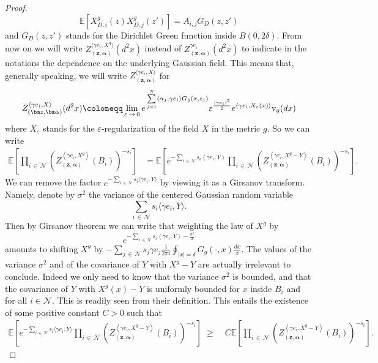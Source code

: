 \documentclass[10pt]{amsart}
\theoremstyle{definition}\newtheorem{defi}[theo]{Definition}\newtheorem{rema}[theo]{Remark}\newtheorem{exam}[theo]{Example}\newtheorem{exem}[theo]{Example}\newtheorem{nota}[theo]{Notation}
\renewcommand{\geq}{\;\geqslant\;}
\newcommand{\rmv}{\mathrm{v}}
\newcommand{\clN}{\mathcal{N}}
\newcommand{\E}{\mathbb{E}}
\newcommand*\eps{\varepsilon}
\let\oldhat\hat
\renewcommand*{\hat}[1]{\mathchoice{\widehat{#1}}{\widehat{#1}}{\oldhat{#1}}{\oldhat{#1}}}
\begin{document}
\begin{proof}
\begin{equation*}
\E\left[X^g_{D,i}(z) X^g_{D,j}(z')\right]=A_{i,j} G_D(z,z')
\end{equation*}
and $G_D(z,z')$ stands for the Dirichlet Green function inside $B(0,2\delta)$. From now on we will write $Z_{(\bm z,\bm \alpha)}^{\langle\gamma e_i,X^g\rangle} (d^2x)$ instead of $Z_{(\bm z,\bm \alpha)}^{\gamma e_i} (d^2x)$ to indicate in the notations the dependence on the underlying Gaussian field. This means that, generally speaking, we will write $Z_{(\bm z,\bm \alpha)}^{\langle\gamma e_i,X\rangle} $ for
\[
Z_{(\bm z,\bm \alpha)}^{\left\langle\gamma e_i,X\right\rangle} (d^2x)\coloneqq \lim_{\eps\,\to\,0}e^{\,\sum\limits_{j=1}^N \langle\alpha_j,\gamma e_i \rangle G_{\hat{g}} (x,z_j) } \eps^{ \frac{|\gamma e_i|^2}{2}} e^{ \langle\gamma e_i, X_\eps(x) \rangle} \rmv_g(dx)
\]
where $X_\eps$ stands for the $\eps$-regularization of the field $X$ in the metric $g$. So we can write
\begin{align*}
\E \left[\prod_{i\,\in\,\clN} \left(Z_{\left(\bm z,\bm \alpha\right)}^{\left\langle\gamma e_i,X^g\right\rangle} \left(B_i\right)\right)^{- s_i} \right] &= \E \left [e^{-\sum_{i\,\in\,\clN}s_i\left\langle\gamma e_i,Y\right\rangle} \prod_{i\,\in\,\clN} \left(Z_{\left(\bm z,\bm \alpha\right)}^{\left\langle\gamma e_i,X^g-Y\right\rangle}\left(B_i\right)\right)^{- s_i} \right].
\end{align*}
We can remove the factor $ e^{-\sum_{i\,\in\,\clN}s_i\langle\gamma e_i,Y\rangle}$ by viewing it as a Girsanov transform. Namely, denote by $\sigma^2$ the variance of the centered Gaussian random variable
\[
\sum_{i\,\in\,\clN}s_i\langle\gamma e_i,Y\rangle.
\]
Then by Girsanov theorem we can write that weighting the law of $X^g$ by
\[
e^{-\sum\limits_{i\,\in\,\clN}s_i\left\langle\gamma e_i,Y\right\rangle-\frac{\sigma^2}{2}}
\]
amounts to shifting $X^g$ by $-\sum_{j\,\in\,\clN}s_j\gamma e_j\frac{1}{2\pi i}\oint_{|x|=\delta}G_g(\cdot,x)\frac{dx}{x}$. The values of the variance $\sigma^2$ and of the covariance of $Y$ with $X^g-Y$ are actually irrelevant to conclude. Indeed we only need to know that the variance $\sigma ^2$ is bounded, and that the covariance of $Y$ with $X^g(x)-Y$ is uniformly bounded for $x$ inside $B_i$ and for all $i\in\clN$. This is readily seen from their definition. This entails the existence of some positive constant $C>0$ such that
\begin{align*}
\E \left[e^{-\sum\limits_{i\,\in\,\clN}s_i\langle\gamma e_i,Y\rangle} \prod_{i\,\in\,\clN} \left(Z_{\left(\bm z,\bm \alpha\right)}^{\left\langle\gamma e_i,X^g-Y\right\rangle} \left(B_i\right)\right)^{- s_i} \right] \geq & C \E \left[\prod_{i\,\in\,\clN} \left(Z_{\left(\bm z,\bm \alpha\right)}^{\left\langle\gamma e_i,X^g-Y\right\rangle} \left(B_i\right)\right)^{- s_i} \right].

\end{align*}
\end{proof}
\end{document}
